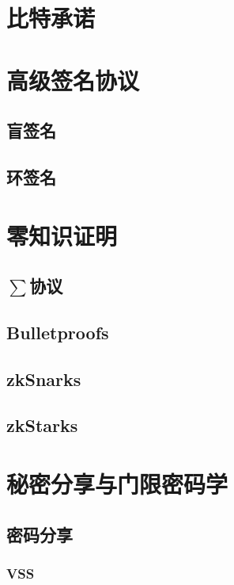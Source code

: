 \documentclass[UTF8]{ctexart}
\begin{document}
\section{比特承诺}

\section{高级签名协议}

\subsection{盲签名}

\subsection{环签名}

\section{零知识证明}

\subsection{$\sum$协议}

\subsection{Bulletproofs}

\subsection{zkSnarks}

\subsection{zkStarks}

\section{秘密分享与门限密码学}

\subsection{密码分享}

\subsubsection{VSS}
\end{document}
